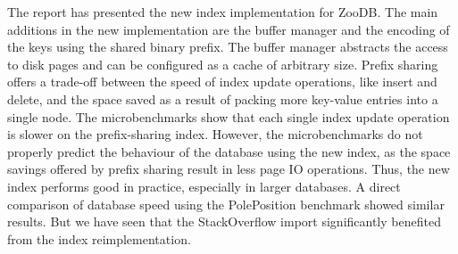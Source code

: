 \documentclass[11pt,a4paper,oneside]{article}
\begin{document}
The report has presented the new index implementation for ZooDB. The main additions in the new implementation are the buffer manager and the encoding of the keys using the shared binary prefix. The buffer manager abstracts the access to disk pages and can be configured as a cache of arbitrary size. Prefix sharing offers a trade-off between the speed of index update operations, like insert and delete, and the space saved as a result of packing more key-value entries into a single node. The microbenchmarks show that each single index update operation is slower on the prefix-sharing index. However, the microbenchmarks do not properly predict the behaviour of the database using the new index, as the space savings offered by prefix sharing result in less page IO operations. Thus, the new index performs good in practice, especially in larger databases. 
A direct comparison of database speed using the PolePosition benchmark showed similar results. 
But we have seen that the StackOverflow import significantly benefited from the index reimplementation.
\end{document}

